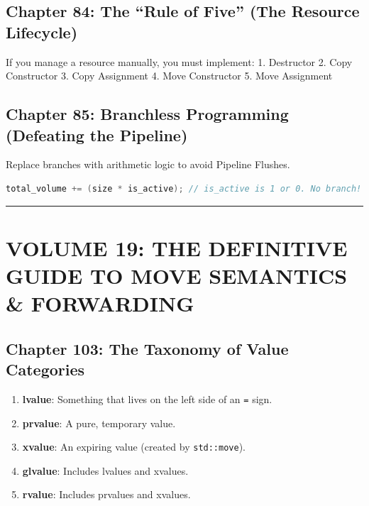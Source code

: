 \hypertarget{chapter-84-the-rule-of-five-the-resource-lifecycle}{%
\subsection{Chapter 84: The ``Rule of Five'' (The Resource
Lifecycle)}\label{chapter-84-the-rule-of-five-the-resource-lifecycle}}

If you manage a resource manually, you must implement: 1. Destructor 2.
Copy Constructor 3. Copy Assignment 4. Move Constructor 5. Move
Assignment

\hypertarget{chapter-85-branchless-programming-defeating-the-pipeline}{%
\subsection{Chapter 85: Branchless Programming (Defeating the
Pipeline)}\label{chapter-85-branchless-programming-defeating-the-pipeline}}

Replace branches with arithmetic logic to avoid Pipeline Flushes.

\begin{lstlisting}[language={C++}]
total_volume += (size * is_active); // is_active is 1 or 0. No branch!
\end{lstlisting}

\begin{center}\rule{0.5\linewidth}{0.5pt}\end{center}

\hypertarget{volume-19-the-definitive-guide-to-move-semantics-forwarding}{%
\section{VOLUME 19: THE DEFINITIVE GUIDE TO MOVE SEMANTICS \&
FORWARDING}\label{volume-19-the-definitive-guide-to-move-semantics-forwarding}}

\hypertarget{chapter-103-the-taxonomy-of-value-categories}{%
\subsection{Chapter 103: The Taxonomy of Value
Categories}\label{chapter-103-the-taxonomy-of-value-categories}}

\begin{enumerate}
\def\labelenumi{\arabic{enumi}.}
\tightlist
\item
  \textbf{lvalue}: Something that lives on the left side of an
  \passthrough{\lstinline!=!} sign.
\item
  \textbf{prvalue}: A pure, temporary value.
\item
  \textbf{xvalue}: An expiring value (created by
  \passthrough{\lstinline!std::move!}).
\item
  \textbf{glvalue}: Includes lvalues and xvalues.
\item
  \textbf{rvalue}: Includes prvalues and xvalues.
\end{enumerate}

